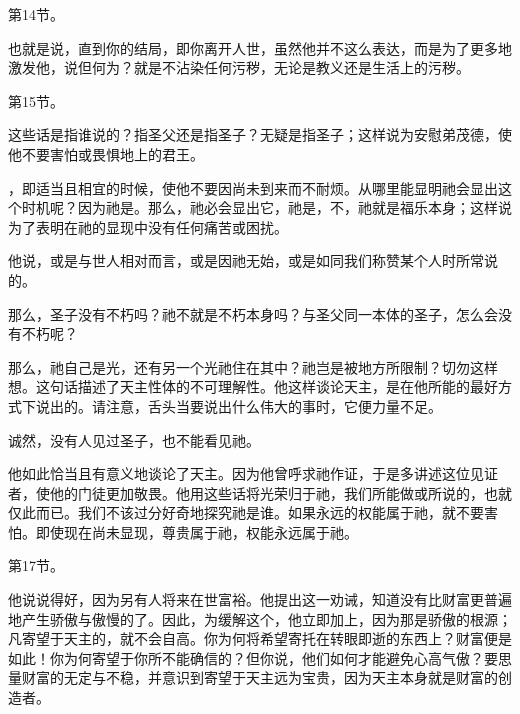 第14节。\par

也就是说，直到你的结局，即你离开人世，虽然他并不这么表达，而是为了更多地激发他，说但何为？就是不沾染任何污秽，无论是教义还是生活上的污秽。\par

第15节。\par

这些话是指谁说的？指圣父还是指圣子？无疑是指圣子；这样说为安慰弟茂德，使他不要害怕或畏惧地上的君王。\par

，即适当且相宜的时候，使他不要因尚未到来而不耐烦。从哪里能显明祂会显出这个时机呢？因为祂是。那么，祂必会显出它，祂是，不，祂就是福乐本身；这样说为了表明在祂的显现中没有任何痛苦或困扰。\par

他说，或是与世人相对而言，或是因祂无始，或是如同我们称赞某个人时所常说的。\par

那么，圣子没有不朽吗？祂不就是不朽本身吗？与圣父同一本体的圣子，怎么会没有不朽呢？\par

那么，祂自己是光，还有另一个光祂住在其中？祂岂是被地方所限制？切勿这样想。这句话描述了天主性体的不可理解性。他这样谈论天主，是在他所能的最好方式下说出的。请注意，舌头当要说出什么伟大的事时，它便力量不足。\par

诚然，没有人见过圣子，也不能看见祂。\par

他如此恰当且有意义地谈论了天主。因为他曾呼求祂作证，于是多讲述这位见证者，使他的门徒更加敬畏。他用这些话将光荣归于祂，我们所能做或所说的，也就仅此而已。我们不该过分好奇地探究祂是谁。如果永远的权能属于祂，就不要害怕。即使现在尚未显现，尊贵属于祂，权能永远属于祂。\par

第17节。\par

他说说得好，因为另有人将来在世富裕。他提出这一劝诫，知道没有比财富更普遍地产生骄傲与傲慢的了。因此，为缓解这个，他立即加上，因为那是骄傲的根源；凡寄望于天主的，就不会自高。你为何将希望寄托在转眼即逝的东西上？财富便是如此！你为何寄望于你所不能确信的？但你说，他们如何才能避免心高气傲？要思量财富的无定与不稳，并意识到寄望于天主远为宝贵，因为天主本身就是财富的创造者。\par

